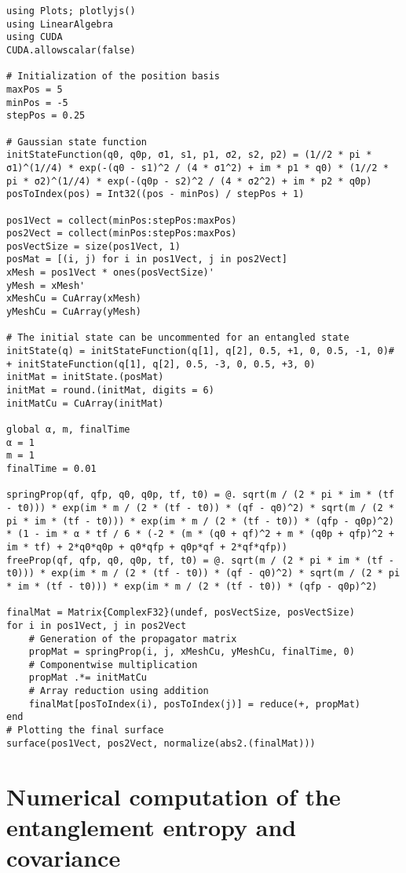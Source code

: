 \begin{verbatim}
using Plots; plotlyjs()
using LinearAlgebra
using CUDA
CUDA.allowscalar(false)

# Initialization of the position basis
maxPos = 5
minPos = -5
stepPos = 0.25

# Gaussian state function
initStateFunction(q0, q0p, σ1, s1, p1, σ2, s2, p2) = (1//2 * pi * σ1)^(1//4) * exp(-(q0 - s1)^2 / (4 * σ1^2) + im * p1 * q0) * (1//2 * pi * σ2)^(1//4) * exp(-(q0p - s2)^2 / (4 * σ2^2) + im * p2 * q0p)
posToIndex(pos) = Int32((pos - minPos) / stepPos + 1)

pos1Vect = collect(minPos:stepPos:maxPos)
pos2Vect = collect(minPos:stepPos:maxPos)
posVectSize = size(pos1Vect, 1)
posMat = [(i, j) for i in pos1Vect, j in pos2Vect]
xMesh = pos1Vect * ones(posVectSize)'
yMesh = xMesh'
xMeshCu = CuArray(xMesh)
yMeshCu = CuArray(yMesh)

# The initial state can be uncommented for an entangled state
initState(q) = initStateFunction(q[1], q[2], 0.5, +1, 0, 0.5, -1, 0)# + initStateFunction(q[1], q[2], 0.5, -3, 0, 0.5, +3, 0)
initMat = initState.(posMat)
initMat = round.(initMat, digits = 6)
initMatCu = CuArray(initMat)

global α, m, finalTime
α = 1
m = 1
finalTime = 0.01

springProp(qf, qfp, q0, q0p, tf, t0) = @. sqrt(m / (2 * pi * im * (tf - t0))) * exp(im * m / (2 * (tf - t0)) * (qf - q0)^2) * sqrt(m / (2 * pi * im * (tf - t0))) * exp(im * m / (2 * (tf - t0)) * (qfp - q0p)^2) * (1 - im * α * tf / 6 * (-2 * (m * (q0 + qf)^2 + m * (q0p + qfp)^2 + im * tf) + 2*q0*q0p + q0*qfp + q0p*qf + 2*qf*qfp))
freeProp(qf, qfp, q0, q0p, tf, t0) = @. sqrt(m / (2 * pi * im * (tf - t0))) * exp(im * m / (2 * (tf - t0)) * (qf - q0)^2) * sqrt(m / (2 * pi * im * (tf - t0))) * exp(im * m / (2 * (tf - t0)) * (qfp - q0p)^2)

finalMat = Matrix{ComplexF32}(undef, posVectSize, posVectSize)
for i in pos1Vect, j in pos2Vect
    # Generation of the propagator matrix
    propMat = springProp(i, j, xMeshCu, yMeshCu, finalTime, 0)
    # Componentwise multiplication
    propMat .*= initMatCu
    # Array reduction using addition
    finalMat[posToIndex(i), posToIndex(j)] = reduce(+, propMat)
end
# Plotting the final surface
surface(pos1Vect, pos2Vect, normalize(abs2.(finalMat)))
\end{verbatim}

\section{Numerical computation of the entanglement entropy and covariance}